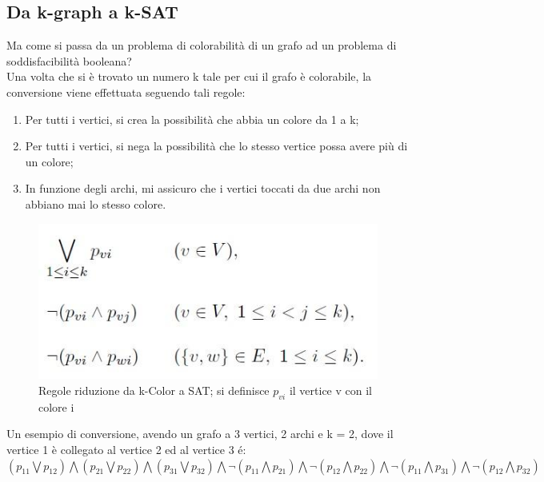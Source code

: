 \documentclass[a4paper,11pt]{article} %
\begin{document}
\subsection{Da k-graph a k-SAT}
Ma come si passa da un problema di colorabilità di un grafo ad un problema di soddisfacibilità booleana?\\
Una volta che si è trovato un numero k tale per cui il grafo è colorabile, la conversione viene effettuata seguendo tali regole:
\begin{enumerate}
	\item Per tutti i vertici, si crea la possibilità che abbia un colore da 1 a k;
	\item Per tutti i vertici, si nega la possibilità che lo stesso vertice possa avere più di un colore;
	\item In funzione degli archi, mi assicuro che i vertici toccati da due archi non abbiano mai lo stesso colore.
\end{enumerate}
\begin{figure}[h]
	\centering
    \includegraphics[scale=0.5]{kcolor_to_sat.jpg}
    \caption{Regole riduzione da k-Color a SAT; si definisce $p_{vi}$ il vertice v con il colore i }
\end{figure}
Un esempio di conversione, avendo un grafo a 3 vertici, 2 archi e k = 2, dove il vertice 1 è collegato al vertice 2 ed al vertice 3 é: \newline
$(p_{11} \bigvee p_{12}) \bigwedge (p_{21} \bigvee p_{22}) \bigwedge (p_{31} \bigvee p_{32}) \bigwedge \lnot(p_{11} \bigwedge p_{21}) \bigwedge \lnot(p_{12} \bigwedge p_{22}) \bigwedge \lnot(p_{11} \bigwedge p_{31}) \bigwedge \lnot(p_{12} \bigwedge p_{32})$
\pagebreak
\end{document}
